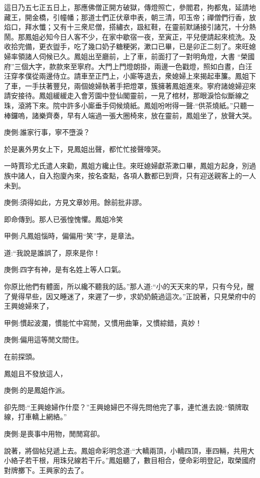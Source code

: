 \begin{parag}
    這日乃五七正五日上，那應佛僧正開方破獄，傳燈照亡，參閻君，拘都鬼，延請地藏王，開金橋，引幢幡；那道士們正伏章申表，朝三清，叩玉帝；禪僧們行香，放焰口，拜水懺；又有十三衆尼僧，搭繡衣，趿紅鞋，在靈前默誦接引諸咒，十分熱鬧。那鳳姐必知今日人客不少，在家中歇宿一夜，至寅正，平兒便請起來梳洗。及收拾完備，更衣盥手，吃了幾口奶子糖粳粥，漱口已畢，已是卯正二刻了。來旺媳婦率領諸人伺候已久。鳳姐出至廳前，上了車，前面打了一對明角燈，大書 “榮國府”三個大字，款款來至寧府。大門上門燈朗掛，兩邊一色戳燈，照如白晝，白汪汪穿孝僕從兩邊侍立。請車至正門上，小廝等退去，衆媳婦上來揭起車簾。鳳姐下了車，一手扶著豐兒，兩個媳婦執著手把燈罩，簇擁著鳳姐進來。寧府諸媳婦迎來請安接待。鳳姐緩緩走入會芳園中登仙閣靈前，一見了棺材，那眼淚恰似斷線之珠，滾將下來。院中許多小廝垂手伺候燒紙。鳳姐吩咐得一聲:“供茶燒紙。”只聽一棒鑼嗚，諸樂齊奏，早有人端過一張大圈椅來，放在靈前，鳳姐坐了，放聲大哭。\begin{note}庚側:誰家行事，寧不墮淚？\end{note}於是裏外男女上下，見鳳姐出聲，都忙忙接聲嚎哭。
\end{parag}


\begin{parag}
    一時賈珍尤氏遣人來勸，鳳姐方纔止住。來旺媳婦獻茶漱口畢，鳳姐方起身，別過族中諸人，自入抱廈內來，按名查點，各項人數都已到齊，只有迎送親客上的一人未到。\begin{note}庚側:須得如此，方見文章妙用。餘前批非謬。\end{note}即命傳到。那人已張惶愧懼。鳳姐冷笑\begin{note}甲側:凡鳳姐惱時，偏偏用“笑”字，是章法。\end{note}道:“我說是誰誤了，原來是你！\begin{note}庚側:四字有神，是有名姓上等人口氣。\end{note}你原比他們有體面，所以纔不聽我的話。”那人道:“小的天天來的早，只有今兒，醒了覺得早些，因又睡迷了，來遲了一步，求奶奶饒過這次。”正說著，只見榮府中的王興媳婦來了，\begin{note}甲側:慣起波瀾，慣能忙中寫閒，又慣用曲筆，又慣綜錯，真妙！\end{note}\begin{note}庚側:偏用這等閒文間住。\end{note}在前探頭。
\end{parag}


\begin{parag}
    鳳姐且不發放這人，\begin{note}庚側:的是鳳姐作派。\end{note}卻先問:“王興媳婦作什麼？”王興媳婦巴不得先問他完了事，連忙進去說:“領牌取線，打車轎上網絡。”\begin{note}庚側:是喪事中用物，閒閒寫卻。\end{note}說著，將個帖兒遞上去。鳳姐命彩明念道:“大轎兩頂，小轎四頂，車四輛，共用大小絡子若干根，用珠兒線若干斤。”鳳姐聽了，數目相合，便命彩明登記，取榮國府對牌擲下。王興家的去了。
\end{parag}



